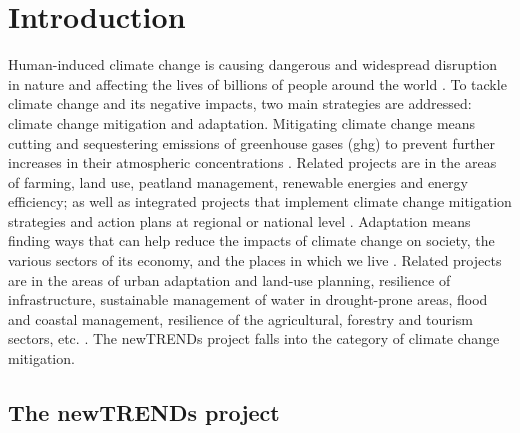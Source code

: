 \chapter{Introduction}

Human-induced climate change is causing dangerous and widespread disruption in nature and affecting the lives of billions of people around the world \cite{ipcc}. 
To tackle climate change and its negative impacts, two main strategies are addressed: climate change mitigation and adaptation. 
Mitigating climate change means cutting and sequestering emissions of greenhouse gases (\gls{ghg}) to prevent further increases in their atmospheric concentrations \cite{handbook}. 
Related projects are in the areas of farming, land use, peatland management, renewable energies and energy efficiency; as well as integrated projects that implement climate change mitigation strategies and action plans at regional or national level \cite{ec}. 
Adaptation means finding ways that can help reduce the impacts of climate change on society, the various sectors of its economy, and the places in which we live \cite{handbook}. 
Related projects are in the areas of urban adaptation and land-use planning, resilience of infrastructure, sustainable management of water in drought-prone areas, flood and coastal management, resilience of the agricultural, forestry and tourism sectors, etc. \cite{ec}.  
The newTRENDs project falls into the category of climate change mitigation. 






\section{The newTRENDs project}


